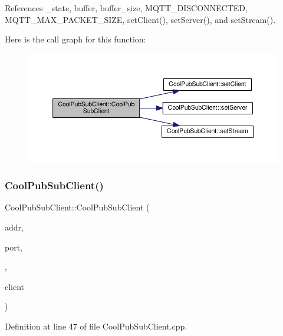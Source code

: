 References \+\_\+state, buffer, buffer\+\_\+size, M\+Q\+T\+T\+\_\+\+D\+I\+S\+C\+O\+N\+N\+E\+C\+T\+ED, M\+Q\+T\+T\+\_\+\+M\+A\+X\+\_\+\+P\+A\+C\+K\+E\+T\+\_\+\+S\+I\+ZE, set\+Client(), set\+Server(), and set\+Stream().

Here is the call graph for this function\+:\nopagebreak
\begin{figure}[H]
\begin{center}
\leavevmode
\includegraphics[width=350pt]{d8/d4b/class_cool_pub_sub_client_af8b1aeb169366da52e3289bb6c238b6b_cgraph}
\end{center}
\end{figure}
\mbox{\label{class_cool_pub_sub_client_a1743a9eeef19b3b6ff1db5be8df55a9c}} 
\subsubsection{\texorpdfstring{Cool\+Pub\+Sub\+Client()}{CoolPubSubClient()}\hspace{0.1cm}{\footnotesize\ttfamily [5/14]}}
{\footnotesize\ttfamily Cool\+Pub\+Sub\+Client\+::\+Cool\+Pub\+Sub\+Client (\begin{DoxyParamCaption}\item[{I\+P\+Address}]{addr,  }\item[{uint16\+\_\+t}]{port,  }\item[{\hyperlink{class_cool_pub_sub_client_a021ec75e9fbaf658370b8005ccfddc14}{M\+Q\+T\+T\+\_\+\+C\+A\+L\+L\+B\+A\+C\+K\+\_\+\+S\+I\+G\+N\+A\+T\+U\+RE}}]{,  }\item[{Client \&}]{client }\end{DoxyParamCaption})}



Definition at line 47 of file Cool\+Pub\+Sub\+Client.\+cpp.



